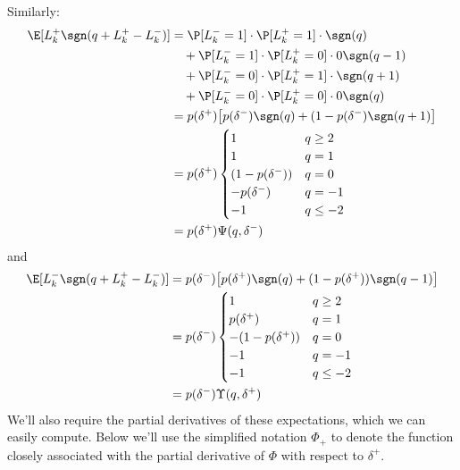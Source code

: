 \documentclass[12pt]{article}
\begin{document}
Similarly:
\begin{align}
\E [ L_k^+ \sgn(q + L_k^+ - L_k^-)] & = \P[L_k^- = 1] \cdot \P[L_k^+ = 1] \cdot \sgn(q) \nonumber \\
& \quad + \P[L_k^- = 1] \cdot \P[L_k^+ = 0] \cdot 0 \sgn(q - 1) \nonumber \\
& \quad +  \P[L_k^- = 0] \cdot \P[L_k^+ = 1] \cdot \sgn(q+1) \nonumber \\
& \quad + \P[L_k^- = 0] \cdot \P[L_k^+ = 0] \cdot 0 \sgn(q) \nonumber \\
& = p(\delta^+) \bigl[ p(\delta^-) \sgn(q) + (1-p(\delta^-) \sgn(q+1) \bigr] \nonumber \\
& = p(\delta^+) \begin{cases} 
1 & q \geq 2 \\
1 & q = 1 \\
(1 - p(\delta^-)) & q = 0 \\
-p(\delta^-) & q = -1 \\
-1 & q \leq -2
\end{cases} \\
& = p(\delta^+) \Psi(q, \delta^-)
\end{align}
and
\begin{align}
\E [ L_k^- \sgn(q + L_k^+ - L_k^-)] & = p(\delta^-) \bigl[ p(\delta^+) \sgn(q) + (1-p(\delta^+)) \sgn(q-1) \bigr] \nonumber \\
& = p(\delta^-) \begin{cases} 
1 & q \geq 2 \\
p(\delta^+) & q = 1 \\
-(1 - p(\delta^+)) & q = 0 \\
-1 & q = -1 \\
-1 & q \leq -2
\end{cases} \\
& = p(\delta^-) \Upsilon(q, \delta^+)
\end{align}
We'll also require the partial derivatives of these expectations, which we can easily compute. Below we'll use the simplified notation $\Phi_+$ to denote the function closely associated with the partial derivative of $ \Phi$ with respect to $\delta^+$.
\end{document}
